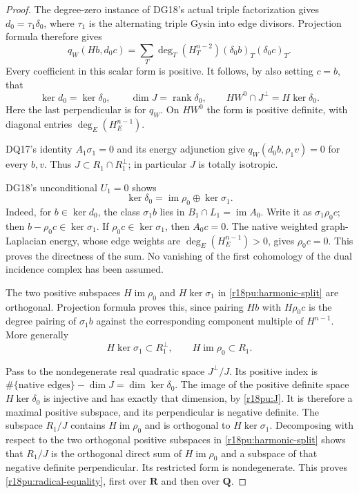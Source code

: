 \begin{proof}
The degree-zero instance of DG18's actual triple factorization gives
$d_0=\tau_1\delta_0$, where $\tau_1$ is the alternating triple Gysin
into edge divisors.  Projection formula therefore gives
\[
 q_W(Hb,d_0c)=
      \sum_T\deg_T(H_T^{n-2})(\delta_0b)_T(\delta_0c)_T .
 \tag{PU18.5}\label{r18pu:scalar-energy}
\]
Every coefficient in this scalar form is positive.  It follows,
by also setting $c=b$, that
\[
       \ker d_0=\ker\delta_0,\qquad
       \dim J=\operatorname{rank}\delta_0,\qquad
       HW^0\cap J^\perp=H\ker\delta_0 .
 \tag{PU18.6}\label{r18pu:J}
\]
Here the last perpendicular is for $q_W$.  On $HW^0$ the form
is positive definite, with diagonal entries
$\deg_E(H_E^{n-1})$.

DQ17's identity $A_1\sigma_1=0$ and its energy adjunction give
$q_W(d_0b,\rho_1v)=0$ for every $b,v$.
Thus $J\subset R_1\cap R_1^\perp$; in particular $J$ is totally
isotropic.

DG18's unconditional $U_1=0$ shows
\[
                 \ker\delta_0=\operatorname{im}\rho_0
                                      \oplus\ker\sigma_1 .
 \tag{PU18.7}\label{r18pu:harmonic-split}
\]
Indeed, for $b\in\ker d_0$, the class $\sigma_1b$ lies in
$B_1\cap L_1=\operatorname{im}A_0$.  Write it as
$\sigma_1\rho_0c$; then $b-\rho_0c\in\ker\sigma_1$.
If $\rho_0c\in\ker\sigma_1$, then $A_0c=0$.
The native weighted graph-Laplacian energy, whose edge weights
are $\deg_E(H_E^{n-1})>0$, gives $\rho_0c=0$.  This proves
the directness of the sum.  No vanishing of the first cohomology
of the dual incidence complex has been assumed.

The two positive subspaces
$H\operatorname{im}\rho_0$ and $H\ker\sigma_1$ in
\eqref{r18pu:harmonic-split} are orthogonal.  Projection formula
proves this, since pairing $Hb$ with $H\rho_0c$ is the degree
pairing of $\sigma_1b$ against the corresponding component
multiple of $H^{n-1}$.  More generally
\[
                    H\ker\sigma_1\subset R_1^\perp,
             \qquad H\operatorname{im}\rho_0\subset R_1.
 \tag{PU18.8}\label{r18pu:two-subspaces}
\]

Pass to the nondegenerate real quadratic space $J^\perp/J$.
Its positive index is
$\#\{\text{native edges}\}-\dim J=\dim\ker\delta_0$.
The image of the positive definite space $H\ker\delta_0$
is injective and has exactly that dimension, by
\eqref{r18pu:J}.  It is therefore a maximal positive subspace,
and its perpendicular is negative definite.
The subspace $R_1/J$ contains
$H\operatorname{im}\rho_0$ and is orthogonal to
$H\ker\sigma_1$.  Decomposing with respect to the two orthogonal
positive subspaces in \eqref{r18pu:harmonic-split} shows that
$R_1/J$ is the orthogonal direct sum of
$H\operatorname{im}\rho_0$ and a subspace of that negative
definite perpendicular.  Its restricted form is nondegenerate.
This proves \eqref{r18pu:radical-equality}, first over $\mathbf R$
and then over $\mathbf Q$.


\end{proof}

